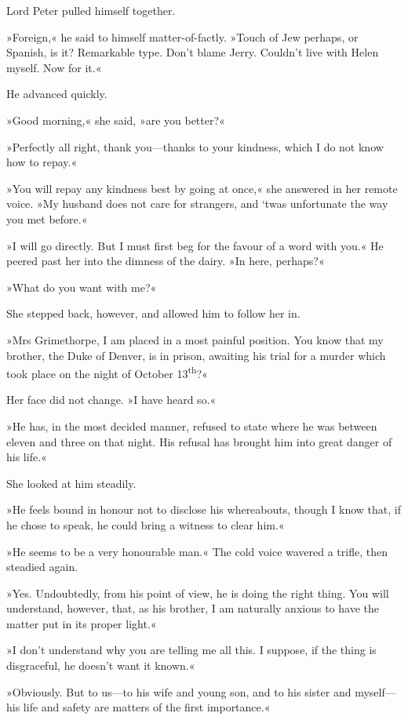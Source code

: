 Lord Peter pulled himself together.

»Foreign,« he said to himself matter-of-factly. »Touch of Jew perhaps, or Spanish, is it? Remarkable type. Don't blame Jerry. Couldn't live with Helen myself. Now for it.«

He advanced quickly.

»Good morning,« she said, »are you better?«

»Perfectly all right, thank you—thanks to your kindness, which I do not know how to repay.«

»You will repay any kindness best by going at once,« she answered in her remote voice. »My husband does not care for strangers, and `twas unfortunate the way you met before.«

»I will go directly. But I must first beg for the favour of a word with you.« He peered past her into the dimness of the dairy. »In here, perhaps?«

»What do you want with me?«

She stepped back, however, and allowed him to follow her in.

»Mrs Grimethorpe, I am placed in a most painful position. You know that my brother, the Duke of Denver, is in prison, awaiting his trial for a murder which took place on the night of October 13\textsuperscript{th}?«

Her face did not change. »I have heard so.«

»He has, in the most decided manner, refused to state where he was between eleven and three on that night. His refusal has brought him into great danger of his life.«

She looked at him steadily.

»He feels bound in honour not to disclose his whereabouts, though I know that, if he chose to speak, he could bring a witness to clear him.«

»He seems to be a very honourable man.« The cold voice wavered a trifle, then steadied again.

»Yes. Undoubtedly, from his point of view, he is doing the right thing. You will understand, however, that, as his brother, I am naturally anxious to have the matter put in its proper light.«

»I don't understand why you are telling me all this. I suppose, if the thing is disgraceful, he doesn't want it known.«

»Obviously. But to us—to his wife and young son, and to his sister and myself—his life and safety are matters of the first importance.«

